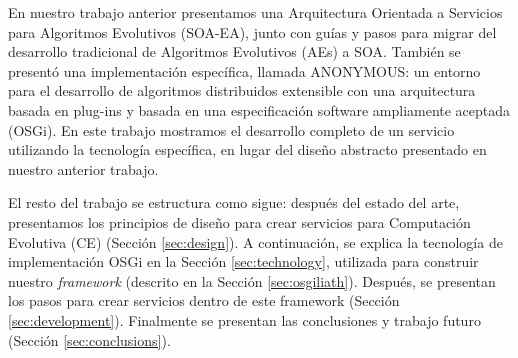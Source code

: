 \documentclass[runningheads]{llncs}
\begin{document}

En nuestro trabajo anterior \cite{OSGILIATH} presentamos una
Arquitectura Orientada a Servicios para Algoritmos Evolutivos
(SOA-EA), junto con guías y pasos para migrar del desarrollo
tradicional de Algoritmos Evolutivos (AEs) a SOA. También se presentó
una implementación específica, llamada ANONYMOUS: %
  un entorno para el
desarrollo de algoritmos distribuidos extensible con una arquitectura
basada en plug-ins y basada en una especificación software ampliamente
aceptada (OSGi). En este trabajo mostramos el desarrollo completo de
un servicio utilizando la tecnología específica, en lugar del diseño
abstracto presentado en nuestro anterior trabajo. %

El resto del trabajo se estructura como sigue: después del estado del
arte, presentamos los principios de diseño para crear servicios para
Computación Evolutiva (CE) (Sección \ref{sec:design}). A continuación,
se explica la tecnología de implementación OSGi en la Sección
\ref{sec:technology}, utilizada para construir nuestro {\em framework}
(descrito en la Sección \ref{sec:osgiliath}). Después, se presentan
los pasos para crear servicios dentro de este framework (Sección
\ref{sec:development}). Finalmente se presentan las conclusiones y
trabajo futuro (Sección \ref{sec:conclusions}). %
\end{document}
